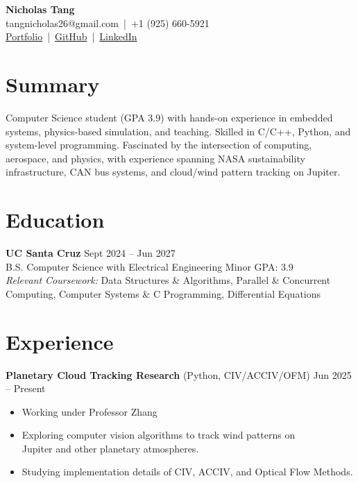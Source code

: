 \documentclass[letterpaper,10pt]{article}
\begin{document}

\begin{center}
    {\LARGE \textbf{Nicholas Tang}} \\ [0.5em]
    tangnicholas26@gmail.com \,|\, +1 (925) 660-5921 \\ [0.3em]
    \href{https://nicholas-tangerine.github.io}{Portfolio} \,|\, 
    \href{https://github.com/nicholas-tangerine}{GitHub} \,|\, 
    \href{https://linkedin.com/in/nicholas-tangerine}{LinkedIn}
\end{center}

\section*{Summary}
Computer Science student (GPA 3.9) with hands-on experience in embedded systems, physics-based simulation, and teaching. Skilled in C/C++, Python, and system-level programming. Fascinated by the intersection of computing, aerospace, and physics, with experience spanning NASA sustainability infrastructure, CAN bus systems, and cloud/wind pattern tracking on Jupiter.

\section*{Education}
\textbf{UC Santa Cruz} \hfill Sept 2024 -- Jun 2027 \\
B.S. Computer Science with Electrical Engineering Minor \hfill GPA: 3.9 \\
\textit{Relevant Coursework:} Data Structures \& Algorithms, Parallel \& Concurrent \\ 
Computing, Computer Systems \& C Programming, Differential Equations

\section*{Experience}
\textbf{Planetary Cloud Tracking Research} (Python, CIV/ACCIV/OFM) \hfill Jun 2025 -- Present
\begin{itemize}
    \item Working under Professor Zhang
    \item Exploring computer vision algorithms to track wind patterns on \\
        Jupiter and other planetary atmospheres.
    \item Studying implementation details of CIV, ACCIV, and Optical Flow
        Methods.
\end{itemize}
\end{document}
